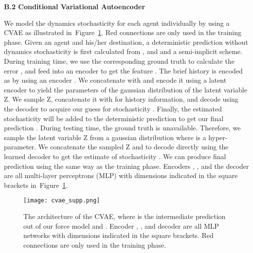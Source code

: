\documentclass[runningheads]{llncs}
\newcommand{\Figref}[1]{Figure~\ref{fig:#1}}
\begin{document}
\vspace{15pt}
\noindent
\textbf{\large B.2 Conditional Variational Autoencoder}
\vspace{10pt}

\noindent
We model the dynamics stochasticity for each agent individually by using a CVAE as illustrated in~\Figref{cvae_supp}. Red connections are only used in the training phase. Given an agent  and his/her destination, a deterministic prediction  without dynamics stochasticity is first calculated from ,  and  and a semi-implicit scheme. During training time, we use the corresponding ground truth  to calculate the error , and feed  into an encoder  to get the feature . The brief history  is encoded as  by using an encoder . We concatenate  with  and encode it using a latent encoder to yield the parameters  of the gaussian distribution of the latent variable Z. We sample Z, concatenate it with  for history information, and decode using the decoder  to acquire our guess for stochasticity . Finally, the estimated stochasticity will be added to the deterministic prediction  to get our final prediction . During testing time, the ground truth  is unavailable. Therefore, we sample the latent variable Z from a gaussian distribution  where  is a hyper-parameter. We concatenate the sampled Z and  to decode directly using the learned decoder  to get the estimate of stochasticity . We can produce final prediction  using the same way as the training phase. Encoders , ,  and the decoder  are all multi-layer perceptrons (MLP) with dimensions indicated in the square brackets in~\Figref{cvae_supp}.

\begin{figure}[tb]
\centering
\texttt{[image: cvae\_supp.png]}
\caption{The architecture of the CVAE, where  is the intermediate prediction out of our force model and . Encoder , ,  and decoder  are all MLP networks with dimensions indicated in the square brackets. Red connections are only used in the training phase.}
\label{fig:cvae_supp}
\end{figure}
\end{document}
